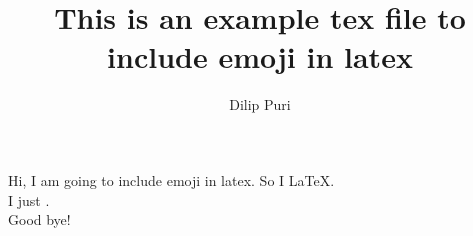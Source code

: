 \documentclass[10pt]{article}
\title{This is an example tex file to include emoji in latex}
\author{Dilip Puri}
\begin{document}
\maketitle
	Hi, I am going to include emoji in latex. So I  \LaTeX.\\
	I just .\\
	
	Good bye! 
\end{document}
